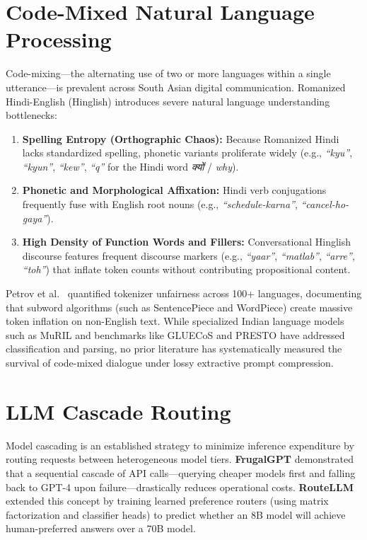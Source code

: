 \section{Code-Mixed Natural Language Processing}
Code-mixing—the alternating use of two or more languages within a single utterance—is prevalent across South Asian digital communication. Romanized Hindi-English (Hinglish) introduces severe natural language understanding bottlenecks:
\begin{enumerate}
    \item \textbf{Spelling Entropy (Orthographic Chaos):} Because Romanized Hindi lacks standardized spelling, phonetic variants proliferate widely (e.g., \textit{``kyu''}, \textit{``kyun''}, \textit{``kew''}, \textit{``q''} for the Hindi word \textit{क्यों} / \textit{why}).
    \item \textbf{Phonetic and Morphological Affixation:} Hindi verb conjugations frequently fuse with English root nouns (e.g., \textit{``schedule-karna''}, \textit{``cancel-ho-gaya''}).
    \item \textbf{High Density of Function Words and Fillers:} Conversational Hinglish discourse features frequent discourse markers (e.g., \textit{``yaar''}, \textit{``matlab''}, \textit{``arre''}, \textit{``toh''}) that inflate token counts without contributing propositional content.
\end{enumerate}

Petrov et al.\ \cite{petrov2023language} quantified tokenizer unfairness across 100+ languages, documenting that subword algorithms (such as SentencePiece and WordPiece) create massive token inflation on non-English text. While specialized Indian language models such as MuRIL \cite{khanuja2021muril} and benchmarks like GLUECoS \cite{khanuja2020gluecos} and PRESTO \cite{goel2023presto} have addressed classification and parsing, no prior literature has systematically measured the survival of code-mixed dialogue under lossy extractive prompt compression.

\section{LLM Cascade Routing}
Model cascading is an established strategy to minimize inference expenditure by routing requests between heterogeneous model tiers. \textbf{FrugalGPT} \cite{chen2023frugalgpt} demonstrated that a sequential cascade of API calls—querying cheaper models first and falling back to GPT-4 upon failure—drastically reduces operational costs. \textbf{RouteLLM} \cite{ong2024routellm} extended this concept by training learned preference routers (using matrix factorization and classifier heads) to predict whether an 8B model will achieve human-preferred answers over a 70B model.

